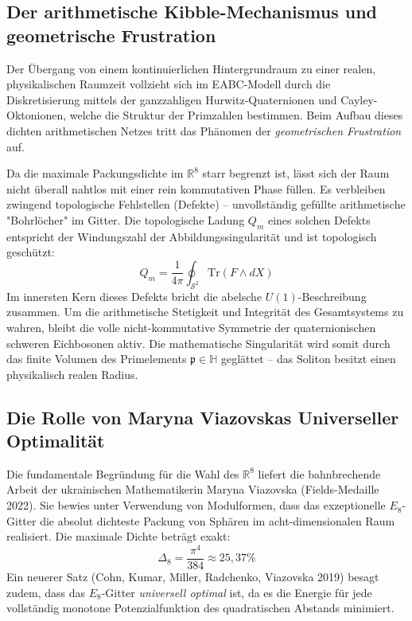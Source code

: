 \documentclass[11pt,a4paper]{article}
\newcommand{\R}{\mathbb{R}}
\newcommand{\Halg}{\mathbb{H}}
\newcommand{\Eoct}{E_8}
\begin{document}
\subsection{Der arithmetische Kibble-Mechanismus und geometrische Frustration}
Der Übergang von einem kontinuierlichen Hintergrundraum zu einer realen, physikalischen Raumzeit vollzieht sich im EABC-Modell durch die Diskretisierung mittels der ganzzahligen Hurwitz-Quaternionen und Cayley-Oktonionen, welche die Struktur der Primzahlen bestimmen. Beim Aufbau dieses dichten arithmetischen Netzes tritt das Phänomen der \textit{geometrischen Frustration} auf.

Da die maximale Packungsdichte im $\R^8$ starr begrenzt ist, lässt sich der Raum nicht überall nahtlos mit einer rein kommutativen Phase füllen. Es verbleiben zwingend topologische Fehlstellen (Defekte) -- unvollständig gefüllte arithmetische "Bohrlöcher" im Gitter. Die topologische Ladung $Q_m$ eines solchen Defekts entspricht der Windungszahl der Abbildungssingularität und ist topologisch geschützt:
\begin{equation}
Q_m = \frac{1}{4\pi} \oint_{\mathcal{S}^2} \text{Tr}(F \wedge dX)
\end{equation}
Im innersten Kern dieses Defekts bricht die abelsche $U(1)$-Beschreibung zusammen. Um die arithmetische Stetigkeit und Integrität des Gesamtsystems zu wahren, bleibt die volle nicht-kommutative Symmetrie der quaternionischen schweren Eichbosonen aktiv. Die mathematische Singularität wird somit durch das finite Volumen des Primelements $\mathfrak{p} \in \Halg$ geglättet -- das Soliton besitzt einen physikalisch realen Radius.

\subsection{Die Rolle von Maryna Viazovskas Universeller Optimalität}
Die fundamentale Begründung für die Wahl des $\R^8$ liefert die bahnbrechende Arbeit der ukrainischen Mathematikerin Maryna Viazovska (Fields-Medaille 2022). Sie bewies unter Verwendung von Modulformen, dass das exzeptionelle $\Eoct$-Gitter die absolut dichteste Packung von Sphären im acht-dimensionalen Raum realisiert. Die maximale Dichte beträgt exakt:
\begin{equation}
\Delta_8 = \frac{\pi^4}{384} \approx 25{,}37\%
\end{equation}
Ein neuerer Satz (Cohn, Kumar, Miller, Radchenko, Viazovska 2019) besagt zudem, dass das $\Eoct$-Gitter \textit{universell optimal} ist, da es die Energie für jede vollständig monotone Potenzialfunktion des quadratischen Abstands minimiert.
\end{document}
